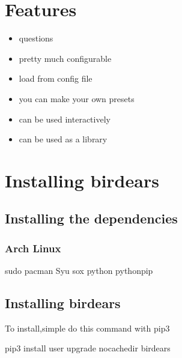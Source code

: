 \documentclass[letterpaper,10pt,english]{sphinxmanual}
\begin{document}
\chapter{Features}
\label{\detokenize{index:features}}\begin{itemize}
\item {} 
questions

\item {} 
pretty much configurable

\item {} 
load from config file

\item {} 
you can make your own presets

\item {} 
can be used interactively 

\item {} 
can be used as a library 

\end{itemize}


\chapter{Installing birdears}
\label{\detokenize{index:installing-birdears}}

\section{Installing the dependencies}
\label{\detokenize{index:installing-the-dependencies}}

\subsection{Arch Linux}
\label{\detokenize{index:arch-linux}}
\begin{sphinxVerbatim}[commandchars=\\\{\}]
sudo pacman \PYGZhy{}Syu sox python python\PYGZhy{}pip
\end{sphinxVerbatim}


\section{Installing birdears}
\label{\detokenize{index:id1}}
To install,simple do this command with pip3

\begin{sphinxVerbatim}[commandchars=\\\{\}]
pip3 install \PYGZhy{}\PYGZhy{}user \PYGZhy{}\PYGZhy{}upgrade \PYGZhy{}\PYGZhy{}no\PYGZhy{}cache\PYGZhy{}dir birdears
\end{sphinxVerbatim}
\end{document}
